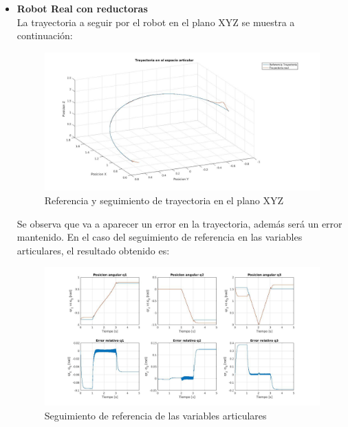 \begin{itemize}

	\item \textbf{Robot Real con reductoras} \\

	La trayectoria a seguir por el robot en el plano XYZ se muestra a continuación:



	\begin{figure}[h!]

		\centering

		\includegraphics[width=.8\textwidth]{exp3_trayPDreal_circular}

		\caption{Referencia y seguimiento de trayectoria en el plano XYZ}

	\end{figure}



	Se observa que va a aparecer un error en la trayectoria, además será un error mantenido. En el caso del seguimiento de referencia en las variables articulares, el resultado obtenido es:



	\begin{figure}[h!]

		\centering

		\includegraphics[width=.8\textwidth]{exp3_posPDrealCR_circular}

		\caption{Seguimiento de referencia de las variables articulares}


\end{figure}
\end{itemize}

